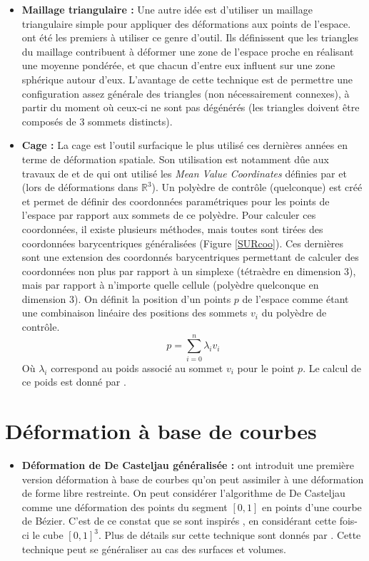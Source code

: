 \begin{itemize}
\item{\textbf{Maillage triangulaire :}} Une autre idée est d'utiliser
  un maillage triangulaire simple pour appliquer des déformations aux
  points de l'espace. \cite{KO03} ont été les premiers à utiliser ce
  genre d'outil. Ils définissent que les triangles du maillage
  contribuent à déformer une zone de l'espace proche en réalisant une
  moyenne pondérée, et que chacun d'entre eux influent sur une zone
  sphérique autour d'eux. L'avantage de cette technique est de
  permettre une configuration assez générale des triangles (non
  nécessairement connexes), à partir du moment où ceux-ci ne sont pas
  dégénérés (les triangles doivent être composés de 3 sommets
  distincts).
\item{\textbf{Cage :}} La cage est l'outil surfacique le plus utilisé
  ces dernières années en terme de déformation spatiale. Son
  utilisation est notamment dûe aux travaux de \cite{JSW05} et de
  \cite{HF06} qui ont utilisé les \textit{Mean Value Coordinates}
  définies par \cite{Flo03} et \cite{FKR05} (lors de déformations dans
  $\mathbb{R}^3$). Un polyèdre de contrôle (quelconque) est créé et
  permet de définir des coordonnées paramétriques pour les points de
  l'espace par rapport aux sommets de ce polyèdre. Pour calculer ces
  coordonnées, il existe plusieurs méthodes, mais toutes sont tirées
  des coordonnées barycentriques généralisées (Figure
  \ref{SURcoo}). Ces dernières sont une extension des coordonnés
  barycentriques permettant de calculer des coordonnées non plus par
  rapport à un simplexe (tétraèdre en dimension 3), mais par rapport à
  n'importe quelle cellule (polyèdre quelconque en dimension 3). On
  définit la position d'un points $p$ de l'espace comme étant une
  combinaison linéaire des positions des sommets $v_i$ du polyèdre de
  contrôle.
  \begin{equation}
    p = \sum_{i=0}^n \lambda_iv_i
  \end{equation}
  Où $\lambda_i$ correspond au poids associé au sommet $v_i$ pour le
  point $p$. Le calcul de ce poids est donné par \cite{FKR05}.
\end{itemize}

\section{Déformation à base de courbes}
\begin{itemize}
\item{\textbf{Déformation de De Casteljau généralisée :}} \cite{CR94}
  ont introduit une première version déformation à base de courbes
  qu'on peut assimiler à une déformation de forme libre restreinte. On
  peut considérer l'algorithme de De Casteljau comme une déformation
  des points du segment $[0,1]$ en points d'une courbe de
  Bézier. C'est de ce constat que se sont inspirés \cite{CR94}, en
  considérant cette fois-ci le cube $[0,1]^3$. Plus de détails sur
  cette technique sont donnés par \cite{BE01}. Cette technique peut se
  généraliser au cas des surfaces et volumes.
\end{itemize}

